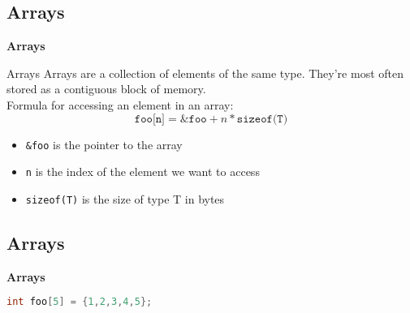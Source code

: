 \subsection{Arrays}
\begin{frame}{\textbf{Arrays}}
    \begin{block}{Arrays}
        Arrays are a collection of elements of the same type.
        They're most often stored as a contiguous block of memory.\\
        Formula for accessing an element in an array:
        \begin{equation*}
            \texttt{foo[n]} = \texttt{\&foo} + n * \texttt{sizeof(T)}
        \end{equation*}
        \begin{itemize}
            \item \texttt{\&foo} is the pointer to the array
            \item \texttt{n} is the index of the element we want to access
            \item \texttt{sizeof(T)} is the size of type T in bytes
        \end{itemize}
    \end{block}    
\end{frame}

\subsection*{Arrays}
\begin{frame}[fragile]{\textbf{Arrays}}
    \begin{example}
        \begin{lstlisting}[language=c]
    int foo[5] = {1,2,3,4,5};
        \end{lstlisting}
    \end{example}
\end{frame}

